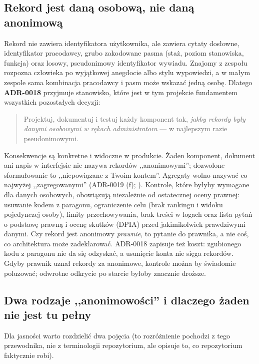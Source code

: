 \subsection{Rekord jest daną osobową, nie daną anonimową}

Rekord nie zawiera identyfikatora użytkownika, ale zawiera cytaty
dosłowne, identyfikator pracodawcy, grubo zakodowane pasma (staż, poziom
stanowiska, funkcja) oraz losowy, pseudonimowy identyfikator wywiadu.
Znajomy z zespołu rozpozna człowieka po wyjątkowej anegdocie albo stylu
wypowiedzi, a w małym zespole sama kombinacja pracodawcy i pasm może
wskazać jedną osobę. Dlatego \textbf{ADR-0018} przyjmuje stanowisko, które
jest w tym projekcie fundamentem wszystkich pozostałych decyzji:

\begin{quote}
Projektuj, dokumentuj i testuj każdy komponent tak, \emph{jakby rekordy były
danymi osobowymi w rękach administratora} --- w najlepszym razie
pseudonimowymi.
\end{quote}

Konsekwencje są konkretne i widoczne w produkcie. Żaden komponent, dokument
ani napis w interfejsie nie nazywa rekordów ,,anonimowymi''; dozwolone
sformułowanie to ,,niepowiązane z Twoim kontem''. Agregaty wolno nazywać co
najwyżej ,,zagregowanymi'' (ADR-0019 (f); ). Kontrole,
które byłyby wymagane dla danych osobowych, obowiązują niezależnie od
ostatecznej oceny prawnej: usuwanie kodem z paragonu, ograniczenie celu (brak
rankingu i widoku pojedynczej osoby), limity przechowywania, brak treści w
logach oraz lista pytań o podstawę prawną i ocenę skutków (DPIA) przed
jakimikolwiek prawdziwymi danymi. Czy rekord jest anonimowy \emph{prawnie},
to pytanie do prawnika, a nie coś, co architektura może zadeklarować.
ADR-0018 zapisuje też koszt: zgubionego kodu z paragonu nie da się odzyskać, a
usunięcie konta nie sięga rekordów. Gdyby prawnik uznał rekordy za anonimowe,
kontrole można by świadomie poluzować; odwrotne odkrycie po starcie byłoby
znacznie droższe.

\subsection{Dwa rodzaje ,,anonimowości'' i dlaczego żaden nie jest tu pełny}

Dla jasności warto rozdzielić dwa pojęcia (to rozróżnienie pochodzi z tego
przewodnika, nie z terminologii repozytorium, ale opisuje to, co repozytorium
faktycznie robi).

